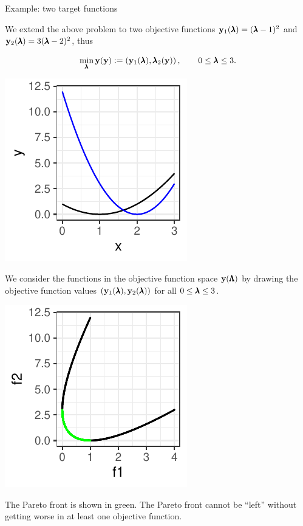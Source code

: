 \begin{frame}[allowframebreaks]{Example: two target functions}

We extend the above problem to two objective functions $\mathbf{y}_1(\pmb{\lambda}) = (\pmb{\lambda} - 1)^2$ and $\mathbf{y}_2(\pmb{\lambda}) = 3(\pmb{\lambda} - 2)^2$, thus

$$
    \min_{\pmb{\lambda}} \mathbf{y}(\mathbf{y}) := \left(\mathbf{y}_1(\pmb{\lambda}), \pmb{\lambda}_2(\mathbf{y})\right), \qquad 0 \le \pmb{\lambda} \le 3.
$$

    \begin{center}
    \includegraphics[scale=0.8]{images/expedia-7-1}
    \end{center}

\framebreak

We consider the functions in the objective function space $\mathbf{y}(\pmb{\Lambda})$ by drawing the objective function values $\left(\mathbf{y}_1(\pmb{\lambda}), \mathbf{y}_2(\pmb{\lambda})\right)$ for all $0 \le \pmb{\lambda} \le 3$.

\vspace*{0.1cm}


    \begin{center}
    \includegraphics[scale=0.9]{images/expedia-8-1}
    \end{center}
    \vspace*{-0.3cm}

The Pareto front is shown in green.
The Pareto front cannot be \enquote{left} without getting worse in at least one objective function.

\end{frame}


